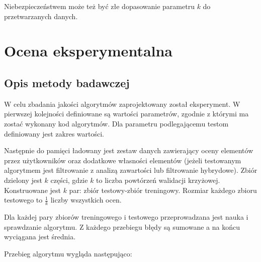 \documentclass[twoside]{iisthesis}
\begin{document}
		 Niebezpieczeństwem może też być złe dopasowanie parametru $k$ do przetwarzanych danych.
 
\chapter{Ocena eksperymentalna}
	\section{Opis metody badawczej}
	
		W celu zbadania jakości algorytmów zaprojektowany został eksperyment. W pierwszej kolejności definiowane są wartości parametrów, zgodnie z którymi ma zostać wykonany kod algorytmów. 
		Dla parametru podlegającemu testom definiowany jest zakres wartości. 
		
		Następnie do pamięci ładowany jest zestaw danych zawierający oceny elementów przez użytkowników oraz dodatkowe własności elementów (jeżeli testowanym algorytmem jest filtrowanie z analizą zawartości lub filtrowanie hybrydowe). Zbiór dzielony jest $k$ części, gdzie $k$ to liczba powtórzeń walidacji krzyżowej. Konstruowane jest $k$ par: zbiór testowy-zbiór treningowy. Rozmiar każdego zbioru testowego to $\frac{1}{k}$ liczby wszystkich ocen.
		
		Dla każdej pary zbiorów treningowego i testowego przeprowadzana jest nauka i sprawdzanie algorytmu. Z każdego przebiegu błędy są sumowane a na końcu wyciągana jest średnia.
		
		Przebieg algorytmu wygląda następująco:
		
\end{document}
